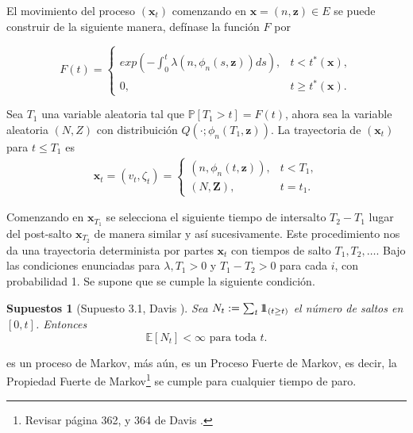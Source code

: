 \documentclass{article}
\newtheorem{Sup}{Supuestos}[section]
\newcommand{\esp}{\mathbb{E}}
\newcommand{\prob}{\mathbb{P}}
\newcommand{\indora}{\mbox{$1$\hspace{-0.8ex}$1$}}
\numberwithin{equation}{section}
\begin{document}
El movimiento del proceso $\left(\mathbf{x}_{t}\right)$ comenzando en $\mathbf{x}=\left(n,\mathbf{z}\right)\in E$ se puede construir de la siguiente manera, def\'inase la funci\'on $F$ por

\begin{equation}
F\left(t\right)=\left\{\begin{array}{ll}\\
exp\left(-\int_{0}^{t}\lambda\left(n,\phi_{n}\left(s,\mathbf{z}\right)\right)ds\right), & t<t^{*}\left(\mathbf{x}\right),\\
0, & t\geq t^{*}\left(\mathbf{x}\right).
\end{array}\right.
\end{equation}

Sea $T_{1}$ una variable aleatoria tal que $\prob\left[T_{1}>t\right]=F\left(t\right)$, ahora sea la variable aleatoria $\left(N,Z\right)$ con distribuici\'on $Q\left(\cdot;\phi_{n}\left(T_{1},\mathbf{z}\right)\right)$. La trayectoria de $\left(\mathbf{x}_{t}\right)$ para $t\leq T_{1}$ es
\begin{eqnarray*}
\mathbf{x}_{t}=\left(v_{t},\zeta_{t}\right)=\left\{\begin{array}{ll}
\left(n,\phi_{n}\left(t,\mathbf{z}\right)\right), & t<T_{1},\\
\left(N,\mathbf{Z}\right), & t=t_{1}.
\end{array}\right.
\end{eqnarray*}

Comenzando en $\mathbf{x}_{T_{1}}$ se selecciona el siguiente tiempo de intersalto $T_{2}-T_{1}$ lugar del post-salto $\mathbf{x}_{T_{2}}$ de manera similar y as\'i sucesivamente. Este procedimiento nos da una trayectoria determinista por partes $\mathbf{x}_{t}$ con tiempos de salto $T_{1},T_{2},\ldots$. Bajo las condiciones enunciadas para $\lambda,T_{1}>0$  y $T_{1}-T_{2}>0$ para cada $i$, con probabilidad 1. Se supone que se cumple la siguiente condici\'on.

\begin{Sup}[Supuesto 3.1, Davis \cite{Davis}]\label{Sup3.1.Davis}
Sea $N_{t}:=\sum_{t}\indora_{\left(t\geq t\right)}$ el n\'umero de saltos en $\left[0,t\right]$. Entonces
\begin{equation}
\esp\left[N_{t}\right]<\infty\textrm{ para toda }t.
\end{equation}
\end{Sup}

es un proceso de Markov, m\'as a\'un, es un Proceso Fuerte de Markov, es decir, la Propiedad Fuerte de Markov\footnote{Revisar p\'agina 362, y 364 de Davis \cite{Davis}.} se cumple para cualquier tiempo de paro.
\end{document}
